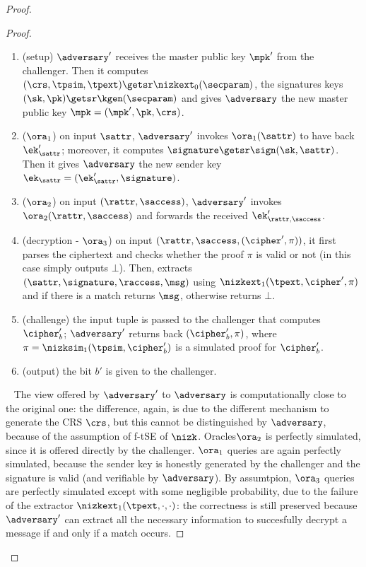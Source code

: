 \begin{proof}
\begin{lemma}
\begin{proof}
            \begin{enumerate}
                \item (setup) $\adversary'$ receives the master public key $\mpk'$ from the challenger. Then it computes $(\crs,\tpsim,\tpext)\getsr\nizkext_0(\secparam)$, the signatures keys $(\sk, \pk) \getsr \kgen(\secparam)$ and gives $\adversary$ the new master public key $\mpk = (\mpk', \pk, \crs)$.
                \item ($\ora_1$) on input $\sattr$, $\adversary'$ invokes $\ora_1(\sattr)$ to have back $\ek'_\sattr$; moreover, it computes $\signature \getsr \sign(\sk, \sattr)$. Then it gives $\adversary$ the new sender key $\ek_\sattr = (\ek'_\sattr, \signature)$.
                \item ($\ora_2$) on input $(\rattr, \saccess)$, $\adversary'$ invokes $\ora_2(\rattr, \saccess)$ and forwards the received $\ek'_{\rattr, \saccess}$.
                \item (decryption - $\ora_3$) on input $(\rattr, \saccess, (\cipher', \pi))$, it first parses the ciphertext and checks whether the proof $\pi$ is valid or not (in this case simply outputs $\bot$). Then, extracts $(\sattr, \signature, \raccess, \msg)$ using $\nizkext_1(\tpext,\cipher',\pi)$ and if there is a match returns $\msg$, otherwise returns $\bot$.
                \item (challenge) the input tuple is passed to the challenger that computes $\cipher'_b$; $\adversary'$ returns back $(\cipher'_b, \pi)$, where $\pi = \nizksim_1(\tpsim, \cipher'_b)$ is a simulated proof for $\cipher'_b$.
                \item (output) the bit $b'$ is given to the challenger.
            \end{enumerate}
            ~\newline
            The view offered by $\adversary'$ to $\adversary$ is computationally close to the original one: the difference, again, is due to the different mechanism to generate the CRS $\crs$, but this cannot be distinguished by $\adversary$, because of the assumption of f-tSE of $\nizk$.
            Oracles$\ora_2$ is perfectly simulated, since it is offered directly by the challenger.
            $\ora_1$ queries are again perfectly simulated, because the sender key is honestly generated by the challenger and the signature is valid (and verifiable by $\adversary$).
            By assumtpion, $\ora_3$ queries are perfectly simulated except with some negligible probability, due to the failure of the extractor $\nizkext_1(\tpext, \cdot, \cdot)$: the correctness is still preserved because $\adversary'$ can extract all the necessary information to succesfully decrypt a message if and only if a match occurs.
        \end{proof}
    \end{lemma}


\end{proof}
